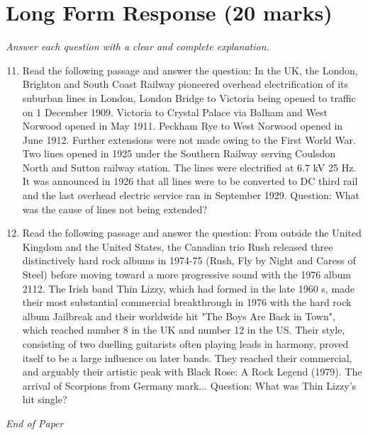 \documentclass[12pt]{article}
\begin{document}
\section*{Long Form Response (20 marks)}
\textit{Answer each question with a clear and complete explanation.}
\begin{enumerate}[label=\arabic*.]
\setcounter{enumi}{10}
\item Read the following passage and answer the question: In the UK, the London, Brighton and South Coast Railway pioneered overhead electrification of its suburban lines in London, London Bridge to Victoria being opened to traffic on 1 December 1909. Victoria to Crystal Palace via Balham and West Norwood opened in May 1911. Peckham Rye to West Norwood opened in June 1912. Further extensions were not made owing to the First World War. Two lines opened in 1925 under the Southern Railway serving Coulsdon North and Sutton railway station. The lines were electrified at 6.7 kV 25 Hz. It was announced in 1926 that all lines were to be converted to DC third rail and the last overhead electric service ran in September 1929. Question: What was the cause of lines not being extended?
\item Read the following passage and answer the question: From outside the United Kingdom and the United States, the Canadian trio Rush released three distinctively hard rock albums in 1974-75 (Rush, Fly by Night and Caress of Steel) before moving toward a more progressive sound with the 1976 album 2112. The Irish band Thin Lizzy, which had formed in the late 1960 s, made their most substantial commercial breakthrough in 1976 with the hard rock album Jailbreak and their worldwide hit "The Boys Are Back in Town", which reached number 8 in the UK and number 12 in the US. Their style, consisting of two duelling guitarists often playing leads in harmony, proved itself to be a large influence on later bands. They reached their commercial, and arguably their artistic peak with Black Rose: A Rock Legend (1979). The arrival of Scorpions from Germany mark... Question: What was Thin Lizzy's hit single?
\end{enumerate}

\vfill
\noindent\textit{End of Paper}
\end{document}

